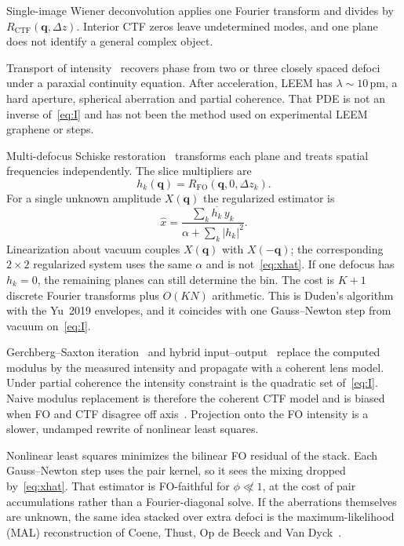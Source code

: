 \documentclass[11pt,a4paper]{article}
\theoremstyle{definition}
\theoremstyle{remark}
\newcommand{\abs}[1]{\lvert#1\rvert}
\newcommand{\Dz}{\Delta z}
\newcommand{\RFO}{R_{\mathrm{FO}}}
\newcommand{\RCTF}{R_{\mathrm{CTF}}}
\begin{document}
Single-image Wiener deconvolution applies one Fourier transform and
divides by $\RCTF(\mathbf{q},\Dz)$.
Interior CTF zeros leave undetermined modes, and one plane does not
identify a general complex object.

Transport of intensity~\cite{Teague1983,Paganin1998} recovers phase
from two or three closely spaced defoci under a paraxial continuity
equation.
After acceleration, LEEM has $\lambda\sim 10\,\mathrm{pm}$, a hard
aperture, spherical aberration and partial coherence.
That PDE is not an inverse of~\eqref{eq:I} and has not been the
method used on experimental LEEM graphene or steps.

Multi-defocus Schiske restoration~\cite{Schiske1968,Duden2014}
transforms each plane and treats spatial frequencies independently.
The slice multipliers are
\begin{equation}
\label{eq:linear}
h_k(\mathbf{q})=\RFO(\mathbf{q},0,\Dz_k).
\end{equation}
For a single unknown amplitude $X(\mathbf{q})$ the regularized
estimator is
\begin{equation}
\label{eq:xhat}
\hat x
=
\frac{\sum_k \overline{h_k}\,y_k}{\alpha+\sum_k\abs{h_k}^2}.
\end{equation}
Linearization about vacuum couples $X(\mathbf{q})$ with
$X(-\mathbf{q})$; the corresponding $2\times 2$ regularized system
uses the same $\alpha$ and is not~\eqref{eq:xhat}.
If one defocus has $h_k=0$, the remaining planes can still determine
the bin.
The cost is $K{+}1$ discrete Fourier transforms plus $O(KN)$ arithmetic.
This is Duden's algorithm with the Yu~2019 envelopes, and it coincides
with one Gauss--Newton step from vacuum on~\eqref{eq:I}.

Gerchberg--Saxton iteration~\cite{GerchbergSaxton1972} and hybrid
input--output~\cite{Fienup1982} replace the computed modulus by the
measured intensity and propagate with a coherent lens model.
Under partial coherence the intensity constraint is the quadratic set
of~\eqref{eq:I}.
Naive modulus replacement is therefore the coherent CTF model and is
biased when FO and CTF disagree off axis~\cite{Yu2017}.
Projection onto the FO intensity is a slower, undamped rewrite of
nonlinear least squares.

Nonlinear least squares minimizes the bilinear FO residual of the
stack.
Each Gauss--Newton step uses the pair kernel, so it sees the mixing
dropped by~\eqref{eq:xhat}.
That estimator is FO-faithful for $\phi\not\ll 1$, at the cost of
pair accumulations rather than a Fourier-diagonal solve.
If the aberrations themselves are unknown, the same idea stacked over
extra defoci is the maximum-likelihood (MAL) reconstruction of Coene,
Thust, Op de Beeck and Van Dyck~\cite{Coene1996}.
\end{document}
